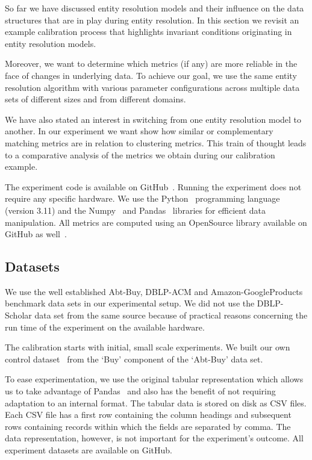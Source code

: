 So far we have discussed entity resolution models and their influence on the
data structures that are in play during entity resolution.
In this section we revisit an example calibration process that highlights
invariant conditions originating in entity resolution models.

Moreover, we want to determine which metrics (if any) are more reliable in the
face of changes in underlying data.
To achieve our goal, we use the same entity resolution algorithm with various
parameter configurations across multiple data sets of different sizes and from
different domains.

We have also stated an interest in switching from one entity resolution model
to another.
In our experiment we want show how similar or complementary matching metrics are
in relation to clustering metrics.
This train of thought leads to a comparative analysis of the metrics we obtain
during our calibration example.

The experiment code is available on GitHub~\cite{matchescu}.
Running the experiment does not require any specific hardware.
We use the Python~\cite{python} programming language (version 3.11) and the
Numpy~\cite{numpy} and Pandas~\cite{pandas2023} libraries for efficient
data manipulation.
All metrics are computed using an OpenSource library available on GitHub as
well~\cite{matchescu-er-metrics2023}.

\subsection{Datasets}\label{subsec:Experiment Datasets}

We use the well established Abt-Buy, DBLP-ACM and Amazon-GoogleProducts~\cite{vldb2010}
benchmark data sets in our experimental setup.
We did not use the DBLP-Scholar data set from the same source because of
practical reasons concerning the run time of the experiment on the available
hardware.

The calibration starts with initial, small scale experiments.
We built our own control dataset~\cite{expdata2023} from the `Buy' component of
the `Abt-Buy' data set.

To ease experimentation, we use the original tabular representation
which allows us to take advantage of Pandas~\cite{pandas2010,pandas2023}
and also has the benefit of not requiring adaptation to an internal format.
The tabular data is stored on disk as CSV files.
Each CSV file has a first row containing the column headings and subsequent
rows containing records within which the fields are separated by comma.
The data representation, however, is not important for the experiment's
outcome. All experiment datasets are available on GitHub\cite{expdata2023}.

